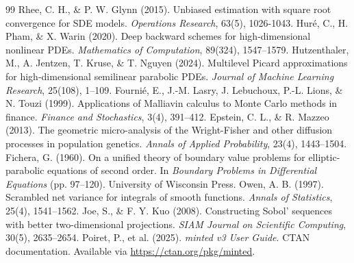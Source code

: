 \documentclass[11pt,letterpaper,oneside]{article}
\numberwithin{equation}{section}
\newcommand{\1}{\mathbf{1}}
\begin{document}
\begin{thebibliography}{99}
 Rhee, C. H., \& P. W. Glynn (2015).
Unbiased estimation with square root convergence for SDE models.
\emph{Operations Research}, 63(5), 1026-1043.
 Hur\'e, C., H. Pham, \& X. Warin (2020). Deep backward schemes for high-dimensional nonlinear PDEs. \emph{Mathematics of Computation}, 89(324), 1547--1579.
 Hutzenthaler, M., A. Jentzen, T. Kruse, \& T. Nguyen (2024). Multilevel Picard approximations for high-dimensional semilinear parabolic PDEs. \emph{Journal of Machine Learning Research}, 25(108), 1--109.
 Fourni\'e, E., J.-M. Lasry, J. Lebuchoux, P.-L. Lions, \& N. Touzi (1999). Applications of Malliavin calculus to Monte Carlo methods in finance. \emph{Finance and Stochastics}, 3(4), 391--412.
 Epstein, C. L., \& R. Mazzeo (2013).
The geometric micro-analysis of the Wright-Fisher and other diffusion processes in population genetics. \emph{Annals of Applied Probability}, 23(4), 1443--1504.
 Fichera, G. (1960). On a unified theory of boundary value problems for elliptic-parabolic equations of second order. In \emph{Boundary Problems in Differential Equations} (pp. 97--120). University of Wisconsin Press.
 Owen, A. B. (1997). Scrambled net variance for integrals of smooth functions. \emph{Annals of Statistics}, 25(4), 1541--1562.
 Joe, S., \& F. Y. Kuo (2008). Constructing Sobol' sequences with better two-dimensional projections. \emph{SIAM Journal on Scientific Computing}, 30(5), 2635--2654.
 Poiret, P., et al. (2025). \emph{minted v3 User Guide}. CTAN documentation. Available via \url{https://ctan.org/pkg/minted}.
\end{thebibliography}
\end{document}
